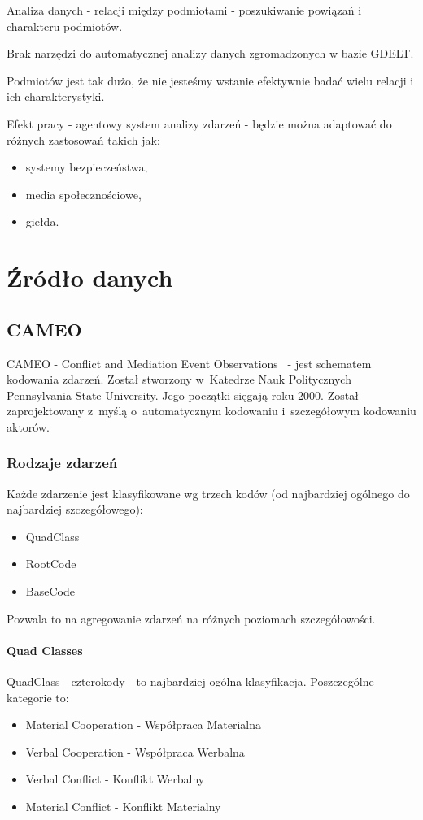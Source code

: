 \documentclass[11pt]{report}
\begin{document}
    Analiza danych - relacji między podmiotami - poszukiwanie powiązań i charakteru podmiotów.

    Brak narzędzi do automatycznej analizy danych zgromadzonych w bazie GDELT.

    Podmiotów jest tak dużo, że nie jesteśmy wstanie efektywnie badać wielu relacji i ich charakterystyki.

    Efekt pracy - agentowy system analizy zdarzeń - będzie można adaptować do różnych zastosowań takich jak:
    \begin{itemize}
        \item systemy bezpieczeństwa,
        \item media społecznościowe,
        \item giełda.
    \end{itemize}


    \chapter{Źródło danych}\label{ch:źródło}


    \section{CAMEO}\label{sec:cameo}
    CAMEO - Conflict and Mediation Event Observations~\cite{GDELTDocumentation} - jest schematem kodowania zdarzeń.
    Został stworzony w~Katedrze Nauk Politycznych Pennsylvania State University.
    Jego początki sięgają roku 2000.
    Został zaprojektowany z~myślą o~automatycznym kodowaniu i~szczegółowym kodowaniu aktorów.

    \subsection{Rodzaje zdarzeń}
    Każde zdarzenie jest klasyfikowane wg trzech kodów (od najbardziej ogólnego do najbardziej szczegółowego):
    \begin{itemize}
        \item QuadClass
        \item RootCode
        \item BaseCode
    \end{itemize}
    Pozwala to na agregowanie zdarzeń na różnych poziomach szczegółowości.

    \subsubsection{Quad Classes}
    QuadClass - czterokody - to najbardziej ogólna klasyfikacja.
    Poszczególne kategorie to:
    \begin{itemize}
        \item Material Cooperation - Współpraca Materialna
        \item Verbal Cooperation - Współpraca Werbalna
        \item Verbal Conflict - Konflikt Werbalny
        \item Material Conflict - Konflikt Materialny
    \end{itemize}
\end{document}
